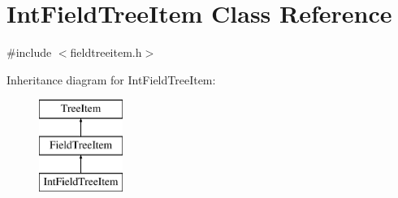 \hypertarget{class_int_field_tree_item}{\section{\-Int\-Field\-Tree\-Item \-Class \-Reference}
\label{class_int_field_tree_item}
}


{\ttfamily \#include $<$fieldtreeitem.\-h$>$}

\-Inheritance diagram for \-Int\-Field\-Tree\-Item\-:\begin{figure}[H]
\begin{center}
\leavevmode
\includegraphics[height=3.000000cm]{class_int_field_tree_item}
\end{center}
\end{figure}

